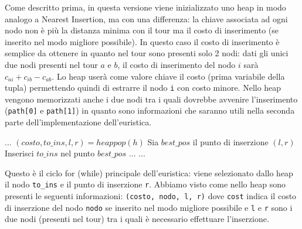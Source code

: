 \documentclass[a4paper,12pt]{report}
\begin{document}
Come descritto prima, in questa versione viene inizializzato uno heap in modo analogo a Nearest Insertion, ma con una differenza: la chiave associata ad ogni nodo non è più la distanza minima con il tour ma il costo di inserimento (se inserito nel modo migliore possibile). In questo caso il costo di inserimento è semplice da ottenere in quanto nel tour sono presenti solo 2 nodi: dati gli unici due nodi presenti nel tour $a$ e $b$, il costo di inserimento del nodo $i$ sarà $c_{ai} + c_{ib} - c_{ab}$. Lo heap userà come valore chiave il costo (prima variabile della tupla) permettendo quindi di estrarre il nodo \lstinline!i! con costo minore. Nello heap vengono memorizzati anche i due nodi tra i quali dovrebbe avvenire l'inserimento (\lstinline!path[0]! e \lstinline!path[1]!) in quanto sono informazioni che saranno utili nella seconda parte dell'implementazione dell'euristica.
\begin{tcolorbox}[colframe=black, colback=white, boxrule=0.5pt, title=Cheapest Insertion Versione 2, coltitle=black, fonttitle=\bfseries, colbacktitle=white, breakable]
  \begin{algorithmic}[1]
    \State ...
      \State $(costo, to\_ins, l, r) = heappop(h)$
      \State Sia $best\_pos$ il punto di inserzione $(l, r)$
      \State Inserisci $to\_ins$ nel punto $best\_pos$
      \State ...
    \EndWhile
    \State ...
  \end{algorithmic}
\end{tcolorbox}
Questo è il ciclo for (while) principale dell'euristica: viene selezionato dallo heap il nodo \lstinline!to_ins! e il punto di inserzione \lstinline!r!. Abbiamo visto come nello heap sono presenti le seguenti informazioni: \lstinline!(costo, nodo, l, r)! dove \lstinline!cost! indica il costo di inserzione del nodo \lstinline!nodo! se inserito nel modo migliore possibile e \lstinline!l! e \lstinline!r! sono i due nodi (presenti nel tour) tra i quali è necessario effettuare l'inserzione.
\end{document}
